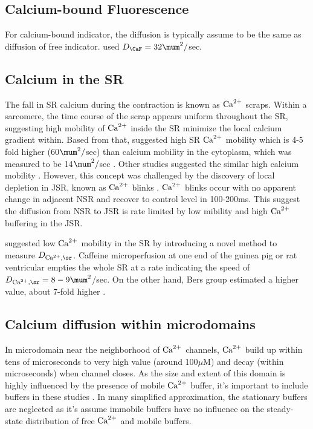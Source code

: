 \subsection{Calcium-bound Fluorescence}

For calcium-bound indicator, the diffusion is typically assume to be the same as
diffusion of free indicator. \citep{groff2008} used $D_\CaF = 32\mum^2/$sec.

\subsection{Calcium in the SR}

The fall in SR calcium during the contraction is known as ${\text{Ca}^{2+}}$ scraps. Within a
sarcomere, the time course of the scrap appears uniform throughout the SR,
suggesting high mobility of ${\text{Ca}^{2+}}$ inside the SR minimize the local calcium
gradient within.
Based from that, \citep{shannon2003cs} suggested high SR ${\text{Ca}^{2+}}$ mobility which is
4-5 fold higher (60$\mum^2/$sec) than calcium mobility in the cytoplasm, which
was measured to be 14$\mum^2/$sec \citep{kushmeric1969}. Other studies suggested
the similar high calcium mobility \citep{keller2007}. However, this concept was
challenged by the discovery of local depletion in JSR, known as ${\text{Ca}^{2+}}$ blinks
\citep{brochet2005,Kubalova2005,niggli2007}. ${\text{Ca}^{2+}}$ blinks occur with no apparent
change in adjacent NSR and recover to control level in 100-200ms. This
suggest the diffusion from NSR to JSR is rate limited by low mibility and high
${\text{Ca}^{2+}}$ buffering in the JSR. 

\citep{swietach2008} suggested low ${\text{Ca}^{2+}}$ mobility in the SR by introducing a
novel method to measure $D_{\Ca,\sr}$. Caffeine microperfusion at one end of the
guinea pig or rat ventricular empties the whole SR at a rate indicating the
speed of $D_{\Ca,\sr}=8-9\mum^2$/sec. On the other hand, Bers group
estimated a higher value, about 7-fold higher \citep{wu2006}. 

\subsection{Calcium diffusion within microdomains}


In microdomain near the neighborhood of ${\text{Ca}^{2+}}$ channels, ${\text{Ca}^{2+}}$ build up within
tens of microseconds to very high value (around 100$\mu$M) and decay (within
microseconds) when channel closes. As the size and extent of this domain is
highly influenced by the presence of mobile ${\text{Ca}^{2+}}$ buffer, it's important to
include buffers in these studies \citep{roberts1994}. In many simplified
approximation, the stationary buffers are neglected as it's assume immobile
buffers have no influence on the steady-state distribution of free ${\text{Ca}^{2+}}$ and
mobile buffers.
 
